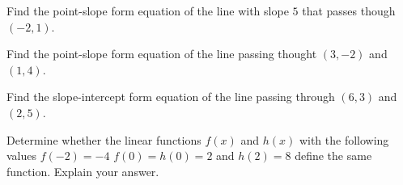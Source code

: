\begin{exercise}
	Find the point-slope form equation of the line with slope $5$ that passes though $(-2, 1)$.
\end{exercise}

\vfill\hfill
\begin{center}
\end{center}

\begin{exercise}
	Find the point-slope form equation of the line passing thought $(3, -2)$ and $(1,4)$.
\end{exercise}


\vfill\hfill
\begin{center}
\end{center}

\newpage

\begin{exercise}
	Find the slope-intercept form equation of the line passing through $(6, 3)$ and $(2, 5)$.
\end{exercise}

\vfill
\hfill
\begin{center}
\end{center}

\begin{exercise}
	Determine whether the linear functions $f(x)$ and $h(x)$ with the following values $f(-2)=-4$  $f(0)=h(0)=2$ and $h(2)=8$ define the same function. Explain your answer.
\end{exercise}

\vfill
\hfill
\begin{center}
\end{center}

